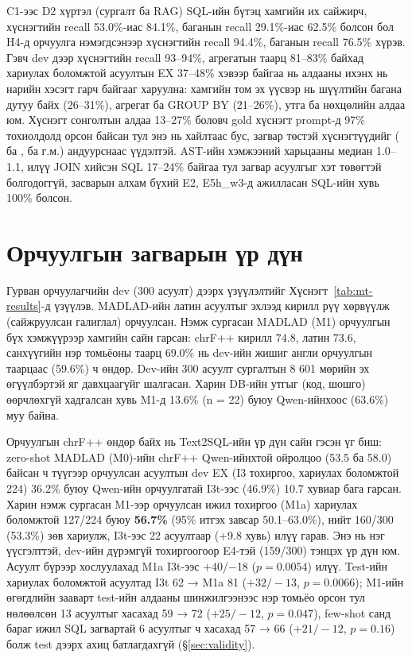 C1-ээс D2 хүртэл (сургалт ба RAG) SQL-ийн бүтэц хамгийн их сайжирч, хүснэгтийн recall 53.0\%-иас 84.1\%, баганын recall
29.1\%-иас 62.5\% болсон бол H4-д орчуулга нэмэгдсэнээр хүснэгтийн recall 94.4\%, баганын recall 76.5\% хүрэв. Гэвч
dev дээр хүснэгтийн recall 93--94\%, агрегатын таарц 81--83\% байхад хариулах боломжтой асуултын EX 37--48\% хэвээр
байгаа нь алдааны ихэнх нь нарийн хэсэгт гарч байгааг харуулна: хамгийн том эх үүсвэр нь шүүлтийн багана дутуу байх
(26--31\%), агрегат ба GROUP BY (21--26\%), утга ба нөхцөлийн алдаа юм. Хүснэгт сонголтын алдаа 13--27\% боловч gold хүснэгт
prompt-д 97\% тохиолдолд орсон байсан тул энэ нь хайлтаас бус, загвар төстэй хүснэгтүүдийг ( ба
,  ба  г.м.) андуурснаас үүдэлтэй. AST-ийн хэмжээний харьцааны
медиан 1.0--1.1, илүү JOIN хийсэн SQL 17--24\% байгаа тул загвар асуулгыг хэт төвөгтэй болгодоггүй, засварын алхам бүхий
E2, E5h\_w3-д ажилласан SQL-ийн хувь 100\% болсон.

\section{Орчуулгын загварын үр дүн}
\label{sec:mt-results}

Гурван орчуулагчийн dev (300 асуулт) дээрх үзүүлэлтийг Хүснэгт~\ref{tab:mt-results}-д үзүүлэв. MADLAD-ийн латин
асуултыг эхлээд кирилл рүү хөрвүүлж (сайжруулсан галиглал) орчуулсан. Нэмж сургасан MADLAD (M1) орчуулгын бүх хэмжүүрээр
хамгийн сайн гарсан: chrF++ кирилл 74.8, латин 73.6, санхүүгийн нэр томьёоны таарц 69.0\% нь dev-ийн жишиг англи
орчуулгын таарцаас (59.6\%) ч өндөр. Dev-ийн 300 асуулт сургалтын 8 601 мөрийн эх өгүүлбэртэй яг давхцаагүйг шалгасан. Харин
DB-ийн утгыг (код, шошго) өөрчлөхгүй хадгалсан хувь M1-д 13.6\% (n = 22) буюу Qwen-ийнхоос (63.6\%) муу байна.

Орчуулгын chrF++ өндөр байх нь Text2SQL-ийн үр дүн сайн гэсэн үг биш: zero-shot MADLAD (M0)-ийн chrF++ Qwen-ийнхтой ойролцоо
(53.5 ба 58.0) байсан ч түүгээр орчуулсан асуултын dev EX (I3 тохиргоо, хариулах боломжтой 224) 36.2\% буюу Qwen-ийн
орчуулгатай I3t-ээс (46.9\%) 10.7 хувиар бага гарсан. Харин нэмж сургасан M1-ээр орчуулсан ижил тохиргоо (M1a) хариулах
боломжтой 127/224 буюу \textbf{56.7\%} (95\% итгэх завсар 50.1--63.0\%), нийт 160/300 (53.3\%) зөв хариулж, I3t-ээс
22 асуултаар (+9.8 хувь) илүү гарав. Энэ нь нэг үүсгэлттэй, dev-ийн дүрэмгүй тохиргоогоор E4-тэй (159/300) тэнцэх үр дүн
юм. Асуулт бүрээр хослуулахад M1a I3t-ээс +40/$-$18 ($p = 0.0054$) илүү. Test-ийн хариулах боломжтой асуултад I3t 62 →
M1a 81 ($+32/-13$, $p = 0.0066$); M1-ийн өгөгдлийн зааварт test-ийн алдааны шинжилгээнээс нэр томьёо орсон тул нөлөөлсөн 13
асуултыг хасахад 59 → 72 ($+25/-12$, $p = 0.047$), few-shot санд бараг ижил SQL загвартай 6 асуултыг ч хасахад 57 → 66
($+21/-12$, $p = 0.16$) болж test дээрх ахиц батлагдахгүй (§\ref{sec:validity}).

